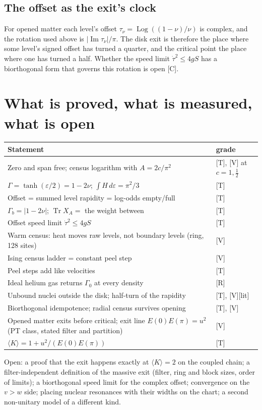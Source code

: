 \documentclass[11pt]{article}
\theoremstyle{definition}
\newcommand{\grade}[1]{\textsf{\small[#1]}}
\newcommand{\Tr}{\operatorname{Tr}}
\begin{document}
\subsection{The offset as the exit's clock}
For opened matter each level's offset $\tau_\nu=\operatorname{Log}((1-\nu)/\nu)$ is complex, and the rotation used above is $|\operatorname{Im}\tau_\nu|/\pi$. The disk exit is therefore the place where some level's signed offset has turned a quarter, and the critical point the place where one has turned a half. Whether the speed limit $\dot\tau^2\le4gS$ has a biorthogonal form that governs this rotation is open \grade{C}.

\section{What is proved, what is measured, what is open}
\begin{center}\small
\begin{tabular}{p{}l}\toprule
Statement & grade\\\midrule
Zero and span free; census logarithm with $A=2c/\pi^2$ & \grade{T}, \grade{V} at $c=1,\tfrac12$\\
$\Gamma=\tanh(\varepsilon/2)=1-2\nu$; $\int H\,d\varepsilon=\pi^2/3$ & \grade{T}\\
Offset = summed level rapidity = log-odds empty/full & \grade{T}\\
$\Gamma_b=|1-2\nu|$; $\Tr X_A=$ the weight between & \grade{T}\\
Offset speed limit $\dot\tau^2\le4gS$ & \grade{T}\\
Warm census: heat moves raw levels, not boundary levels (ring, 128 sites) & \grade{V}\\
Ising census ladder = constant peel step & \grade{V}\\
Peel steps add like velocities & \grade{T}\\
Ideal helium gas returns $\Gamma_0$ at every density & \grade{R}\\
Unbound nuclei outside the disk; half-turn of the rapidity & \grade{T}, \grade{V}\grade{lit}\\
Biorthogonal idempotence; radial census survives opening & \grade{T}, \grade{V}\\
Opened matter exits before critical; exit line $E(0)E(\pi)=u^2$ (PT class, stated filter and partition) & \grade{V}\\
$\langle K\rangle=1+u^2/(E(0)E(\pi))$ & \grade{T}\\\bottomrule
\end{tabular}
\end{center}
\noindent Open: a proof that the exit happens exactly at $\langle K\rangle=2$ on the coupled chain; a filter-independent definition of the massive exit (filter, ring and block sizes, order of limits); a biorthogonal speed limit for the complex offset; convergence on the $v>w$ side; placing nuclear resonances with their widths on the chart; a second non-unitary model of a different kind.
\end{document}
